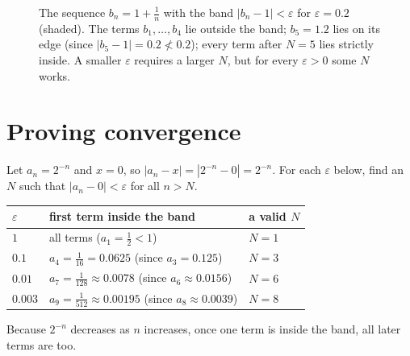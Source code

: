 \begin{figure}[ht]
\centering
{}
\caption{The sequence $b_n=1+\frac1n$ with the band $|b_n-1|<\varepsilon$ for $\varepsilon=0.2$ (shaded). The terms $b_1,\dots,b_4$
lie outside the band; $b_5=1.2$ lies on its edge (since $|b_5-1|=0.2\not<0.2$); every term after $N=5$ lies strictly inside. A
smaller $\varepsilon$ requires a larger $N$, but for every $\varepsilon>0$ some $N$ works.}
\label{fig:epsilon-band}
\end{figure}

\section{Proving convergence}\label{sec:proving-convergence}

\begin{example}
Let $a_n=2^{-n}$ and $x=0$, so $|a_n-x|=|2^{-n}-0|=2^{-n}$. For each $\varepsilon$ below, find an $N$ such that
$|a_n-0|<\varepsilon$ for all $n>N$. 
\solution
\begin{center}
\begin{tabular}{@{}lll@{}}
\toprule
$\varepsilon$ & first term inside the band & a valid $N$\\
\midrule
$1$ & all terms ($a_1=\tfrac12<1$) & $N=1$\\
$0.1$ & $a_4=\tfrac1{16}=0.0625$ (since $a_3=0.125$) & $N=3$\\
$0.01$ & $a_7=\tfrac1{128}\approx0.0078$ (since $a_6\approx0.0156$) & $N=6$\\
$0.003$ & $a_9=\tfrac1{512}\approx0.00195$ (since $a_8\approx0.0039$) & $N=8$\\
\bottomrule
\end{tabular}
\end{center}
Because $2^{-n}$ decreases as $n$ increases, once one term is inside the band, all later terms are too.
\end{example}

